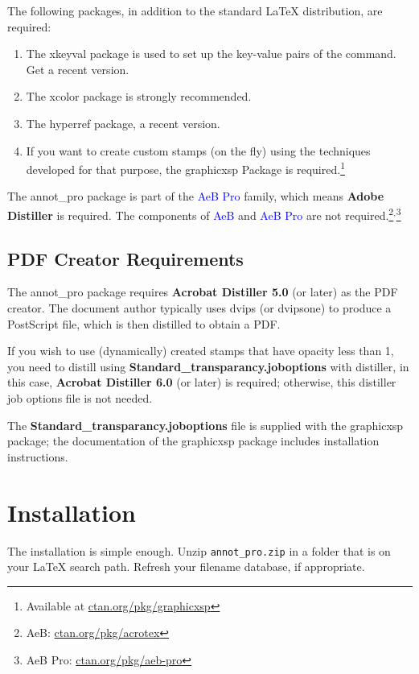 \documentclass[12pt]{article}
\begin{document}
The following packages, in addition to the standard {\LaTeX}
distribution, are required:
\begin{enumerate}
  \item The \textsf{xkeyval} package is used to set up the key-value
      pairs of the  command. Get a recent version.
  \item The \textsf{xcolor} package is strongly recommended.
  \item The \textsf{hyperref} package, a recent version.
  \item If you want to create custom stamps (on the fly) using the techniques
      developed for that purpose, the \textsf{graphicxsp} Package is required.\footnote
      {Available at \href{http://ctan.org/pkg/graphicxsp}{ctan.org/pkg/graphicxsp}}
\end{enumerate}
The \textsf{annot\_pro} package is part of the \textcolor{blue}{AeB
Pro} family, which means \textbf{Adobe Distiller} is required. The
components of \textcolor{blue}{AeB} and \textcolor{blue}{AeB Pro}
are not required.\footnote{AeB: \href{http://ctan.org/pkg/acrotex}{ctan.org/pkg/acrotex}}${}^{,}$\footnote{AeB Pro:
\href{http://ctan.org/pkg/aeb-pro}{ctan.org/pkg/aeb-pro}}

\subsection{PDF Creator Requirements}

The \textsf{annot\_pro} package requires \textbf{Acrobat Distiller 5.0} (or
later) as the PDF creator. The document author typically uses dvips (or dvipsone) to
produce a PostScript file, which is then distilled to obtain a PDF.

If you wish to use (dynamically) created stamps that have opacity less than 1,
you need to distill using \textbf{Standard\_transparancy.joboptions} with distiller,
in this case, \textbf{Acrobat Distiller 6.0} (or later) is required; otherwise, this
distiller job options file is not needed.

The \textbf{Standard\_transparancy.joboptions} file is supplied with the \textsf{graphicxsp}
package; the documentation of the \textsf{graphicxsp} package includes installation instructions.

\section{Installation}

The installation is simple enough. Unzip \texttt{annot\_pro.zip} in a
folder that is on your {\LaTeX} search path.  Refresh your filename
database, if appropriate.
\end{document}
